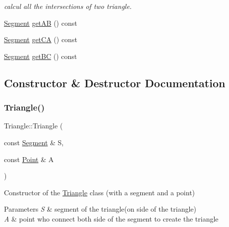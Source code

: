 \begin{DoxyCompactItemize}
\begin{DoxyCompactList}\small\item\em calcul all the intersections of two triangle. \end{DoxyCompactList}\item 
\hyperlink{class_segment}{Segment} \hyperlink{class_triangle_a360f842608dd44bc1c62cfc7f2a15805}{get\+AB} () const
\item 
\hyperlink{class_segment}{Segment} \hyperlink{class_triangle_a17394838467805e991e28444b7d805b5}{get\+CA} () const
\item 
\hyperlink{class_segment}{Segment} \hyperlink{class_triangle_a8e4a0791b3208015057a8d5effc653ae}{get\+BC} () const
\end{DoxyCompactItemize}


\subsection{Constructor \& Destructor Documentation}
\hypertarget{class_triangle_adb8210bc99b01e6c680a4bb8f72c3707}{}\label{class_triangle_adb8210bc99b01e6c680a4bb8f72c3707} 
\subsubsection{\texorpdfstring{Triangle()}{Triangle()}\hspace{0.1cm}{\footnotesize\ttfamily [1/2]}}
{\footnotesize\ttfamily Triangle\+::\+Triangle (\begin{DoxyParamCaption}\item[{const \hyperlink{class_segment}{Segment} \&}]{S,  }\item[{const \hyperlink{class_point}{Point} \&}]{A }\end{DoxyParamCaption})}



Constructor of the \hyperlink{class_triangle}{Triangle} class (with a segment and a point) 


\begin{DoxyParams}{Parameters}
{\em S} & segment of the triangle(on side of the triangle) \\
\hline
{\em A} & point who connect both side of the segment to create the triangle \\
\hline
\end{DoxyParams}
\hypertarget{class_triangle_a272302dade63e2f5944c1b484b98eea6}{}\label{class_triangle_a272302dade63e2f5944c1b484b98eea6} 
